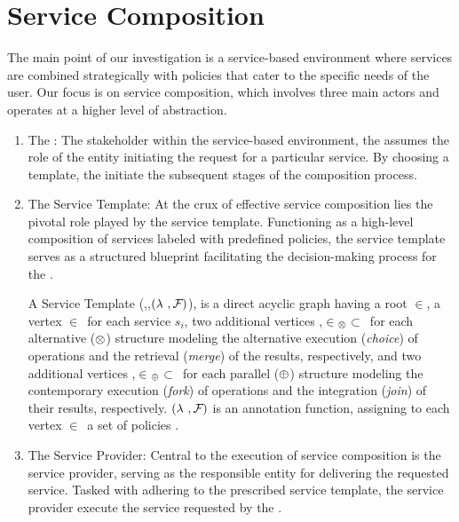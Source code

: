 \section{Service Composition}

The main point of our investigation is a service-based environment where services are combined strategically with policies that cater to the specific needs of the user.
Our focus is on service composition, which involves three main actors and operates at a higher level of abstraction.
\begin{enumerate}
  \item The \User:
        The stakeholder within the service-based environment,
        the \user assumes the role of the entity initiating the request for a particular service.
        By choosing a template, the \user initiate the subsequent stages of the composition process.
  \item The Service Template:
        At the crux of effective service composition lies the pivotal role played by the service template.
        Functioning as a high-level composition of services labeled with predefined policies,
        the service template serves as a structured blueprint facilitating the decision-making process for the  \user.
        \begin{definition} \label{def:pipeline}
          A Service Template \T(\V,\E,$(\lambda~,\mathcal{F}_{}){}$), is a direct acyclic graph having a root $\in$\V, a vertex $\in$\V\ for each service $s_i$,
          two additional vertices ,$\in$\V$_{\otimes}$$\subset$\V\ for each alternative ($\otimes$) structure modeling the alternative execution (\emph{choice}) of operations and the retrieval (\emph{merge}) of the results,
                respectively, and two additional vertices ,$\in$\V$_{\oplus}$$\subset$\V\ for each parallel ($\oplus$) structure modeling the contemporary execution (\emph{fork}) of operations and the integration (\emph{join}) of their results, respectively. $(\lambda~,\mathcal{F}_{}){}$ is an annotation function, assigning to each vertex $\in$\V\ a set of policies .
        \end{definition}
  \item The Service Provider:
        Central to the execution of service composition is the service provider,
        serving as the responsible entity for delivering the requested service.
        Tasked with adhering to the prescribed service template, the service provider execute the service requested by the \user.
\end{enumerate}

